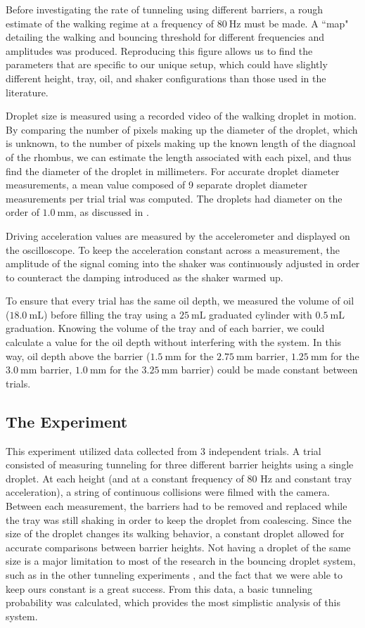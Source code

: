 Before investigating the rate of tunneling using different barriers, a rough estimate of the walking regime at a frequency of $80~\mathrm{Hz}$ must be made. A ``map" detailing the walking and bouncing threshold for different frequencies and amplitudes was produced. Reproducing this figure allows us to find the parameters that are specific to our unique setup, which could have slightly different height, tray, oil, and shaker configurations than those used in the literature. 

Droplet size is measured using a recorded video of the walking droplet in motion. By comparing the number of pixels making up the diameter of the droplet, which is unknown, to the number of pixels making up the known length of the diagnoal of the rhombus, we can estimate the length associated with each pixel, and thus find the diameter of the droplet in millimeters. For accurate droplet diameter measurements, a mean value composed of 9 separate  droplet diameter measurements per trial trial was computed. The droplets had diameter on the order of $1.0~\mathrm{mm}$, as discussed in . 

Driving acceleration values are measured by the accelerometer and displayed on the oscilloscope. To keep the acceleration constant across a measurement, the amplitude of the signal coming into the shaker was continuously adjusted in order to counteract the damping introduced as the shaker warmed up.

To ensure that every trial has the same oil depth, we measured the volume of oil ($18.0~\mathrm{mL}$) before filling the tray using a $25~\mathrm{mL}$ graduated cylinder with $0.5~\mathrm{mL}$ graduation. Knowing the volume of the tray and of each barrier, we could calculate a value for the oil depth without interfering with the system. In this way, oil depth above the barrier ($1.5~\mathrm{mm}$ for the $2.75~\mathrm{mm}$ barrier, $1.25~\mathrm{mm}$ for the $3.0~\mathrm{mm}$ barrier, $1.0~\mathrm{mm}$ for the $3.25~\mathrm{mm}$ barrier) could be made constant between trials. 

\subsection{The Experiment}

This experiment utilized data collected from 3 independent trials. A trial consisted of measuring tunneling for three different barrier heights using a single droplet. At each height (and at a constant frequency of 80 Hz and constant tray acceleration), a string of continuous collisions were filmed with the camera. Between each measurement, the barriers had to be removed and replaced while the tray was still shaking in order to keep the droplet from coalescing. Since the size of the droplet changes its walking behavior, a constant droplet allowed for accurate comparisons between barrier heights. Not having a droplet of the same size is a major limitation to most of the research in the bouncing droplet system, such as in the other tunneling experiments \cite{tunneling}, and the fact that we were able to keep ours constant is a great success. From this data, a basic tunneling probability was calculated, which provides the most simplistic analysis of this system. 

